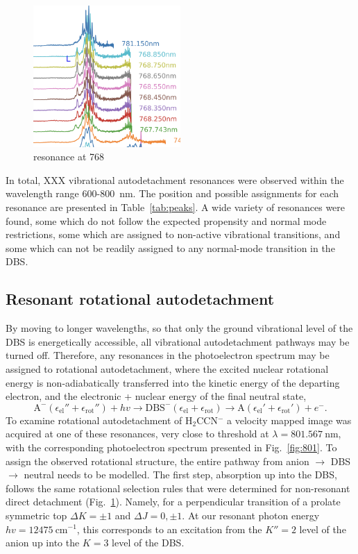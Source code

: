 \documentclass[journal=jpcafh,manuscript=article,layout=onecolumn, 12pt]{achemso}
\begin{document}
\begin{figure}
	\includegraphics[width=0.5\textwidth]{scripts/768}
	\caption{resonance at 768}
	\label{fig:768}
\end{figure}

In total, XXX vibrational autodetachment resonances were observed within the wavelength range 600-800~nm. The position and possible assignments for each resonance are presented in Table~\ref{tab:peaks}. A wide variety of resonances were found, some which do not follow the expected propensity and normal mode restrictions, some which are assigned to non-active vibrational transitions, and some which can not be readily assigned to any normal-mode transition in the DBS.

\subsection{Resonant rotational autodetachment}
By moving to longer wavelengths, so that only the ground vibrational level of the DBS is energetically accessible, all vibrational autodetachment pathways may be turned off. Therefore, any resonances in the photoelectron spectrum may be assigned to rotational autodetachment, where the excited nuclear rotational energy is non-adiabatically transferred into the kinetic energy of the departing electron, and the electronic + nuclear energy of the final neutral state,
\begin{equation}
	\text{A}^-(\epsilon_{\text{el}}''+\epsilon_{\text{rot}}'') + hv \rightarrow \text{DBS}^-(\epsilon_{\text{el}}+\epsilon_{\text{rot}}) \rightarrow \text{A}(\epsilon_{\text{el}}'+\epsilon_{\text{rot}}') + e^-.
	\label{eq:rot-energy}
\end{equation}
To examine rotational autodetachment of H$_2$CCN$^-$ a velocity mapped image was acquired at one of these resonances, very close to threshold at $\lambda = 801.567~$nm, with the corresponding photoelectron spectrum presented in Fig.~\ref{fig:801}. To assign the observed rotational structure, the entire pathway from anion $\rightarrow$ DBS $\rightarrow$ neutral needs to be modelled. The first step, absorption up into the DBS, follows the same rotational selection rules that were determined for non-resonant direct detachment (Fig.~\ref{fig:768}). Namely, for a perpendicular transition of a prolate symmetric top $\Delta K = \pm 1$ and $\Delta J = 0,\pm1$. At our resonant photon energy $hv = 12475~$cm$^{-1}$, this corresponds to an excitation from the $K''=2$ level of the anion up into the $K=3$ level of the DBS.
\end{document}
